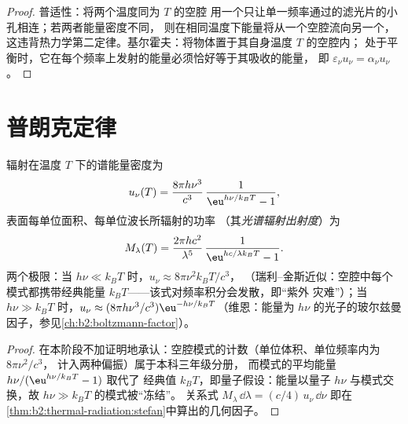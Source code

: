 \begin{proof}
普适性：将两个温度同为 $T$ 的空腔
用一个只让单一频率通过的滤光片的小孔相连；若两者能量密度不同，
则在相同温度下能量将从一个空腔流向另一个，
这违背热力学第二定律。基尔霍夫：将物体置于其自身温度 $T$ 的空腔内；
处于平衡时，它在每个频率上发射的能量必须恰好等于其吸收的能量，
即 $\varepsilon_\nu u_\nu = \alpha_\nu u_\nu$。
\end{proof}

\section{普朗克定律}

\begin{theorem}[普朗克定律]\label{thm:b2:thermal-radiation:planck}
辐射在温度
$T$ 下的谱能量密度为
\[
u_\nu(T) = \frac{8\pi h\nu^3}{c^3}\,\frac{1}{\eu^{h\nu/k_BT} - 1},
\]
表面每单位面积、每单位波长所辐射的功率
（其\emph{光谱辐射出射度}）为
\[
M_\lambda(T) = \frac{2\pi hc^2}{\lambda^5}\,\frac{1}{\eu^{hc/\lambda k_BT} - 1}.
\]
两个极限：当 $h\nu \ll k_BT$ 时，$u_\nu \approx 8\pi\nu^2 k_BT/c^3$，
（瑞利–金斯近似：空腔中每个模式都携带经典能量
$k_BT$——该式对频率积分会发散，即“紫外
灾难”）；当 $h\nu \gg k_BT$ 时，$u_\nu \approx (8\pi h\nu^3/c^3)
\eu^{-h\nu/k_BT}$（维恩：能量为
$h\nu$ 的光子的玻尔兹曼因子，参见\cref{ch:b2:boltzmann-factor}）。
\end{theorem}

\begin{proof}
在本阶段不加证明地承认：空腔模式的计数（单位体积、单位频率内为 $8\pi\nu^2/c^3$，
计入两种偏振）属于本科三年级分册，
而模式的平均能量 $h\nu/(\eu^{h\nu/k_BT} - 1)$ 取代了
经典值 $k_BT$，即量子假设：能量以量子
$h\nu$ 与模式交换，故 $h\nu \gg k_BT$ 的模式被“冻结”。
关系式 $M_\lambda\,\dd\lambda = (c/4)\,u_\nu\,\dd\nu$
即在\cref{thm:b2:thermal-radiation:stefan}中算出的几何因子。
\end{proof}

